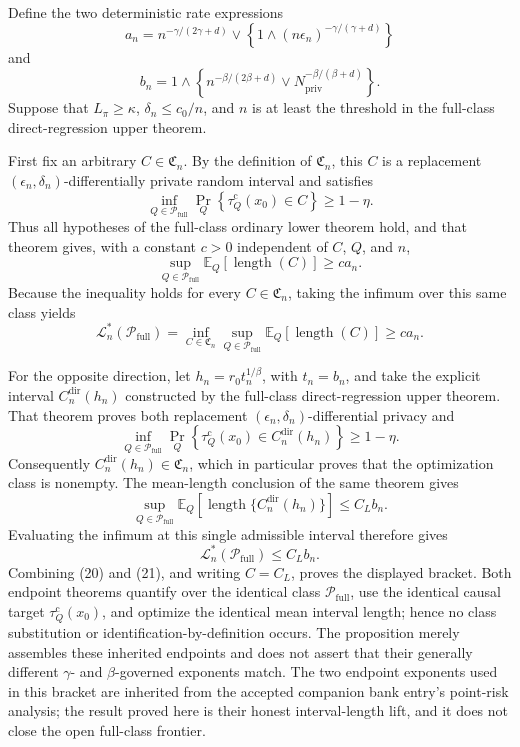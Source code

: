 Define the two deterministic rate expressions
\[
 a_n=
 n^{-\gamma/(2\gamma+d)}
 \vee\left\{1\wedge(n\epsilon_n)^{-\gamma/(\gamma+d)}\right\}
\]
and
\[
 b_n=
 1\wedge\left\{
 n^{-\beta/(2\beta+d)}
 \vee N_{\mathrm{priv}}^{-\beta/(\beta+d)}
 \right\}.
\]
Suppose that \(L_\pi\ge\kappa\), \(\delta_n\le c_0/n\), and \(n\) is at least the threshold in the full-class direct-regression upper theorem.

First fix an arbitrary \(C\in\mathfrak C_n\).  By the definition of \(\mathfrak C_n\), this \(C\) is a replacement \((\epsilon_n,\delta_n)\)-differentially private random interval and satisfies
\[
 \inf_{Q\in\mathcal P_{\mathrm{full}}}
 \Pr_Q\!\left\{\tau_Q^{\mathrm c}(x_0)\in C\right\}
 \ge 1-\eta.
\]
Thus all hypotheses of the full-class ordinary lower theorem hold, and that theorem gives, with a constant \(c>0\) independent of \(C\), \(Q\), and \(n\),
\[
 \sup_{Q\in\mathcal P_{\mathrm{full}}}
 \mathbb E_Q[\operatorname{length}(C)]
 \ge c a_n.
\]
Because the inequality holds for every \(C\in\mathfrak C_n\), taking the infimum over this same class yields
\[
 \mathcal L_n^*(\mathcal P_{\mathrm{full}})
 =\inf_{C\in\mathfrak C_n}
   \sup_{Q\in\mathcal P_{\mathrm{full}}}
   \mathbb E_Q[\operatorname{length}(C)]
 \ge c a_n.
\tag{20}
\]

For the opposite direction, let \(h_n=r_0t_n^{1/\beta}\), with \(t_n=b_n\), and take the explicit interval \(C_n^{\mathrm{dir}}(h_n)\) constructed by the full-class direct-regression upper theorem.  That theorem proves both replacement \((\epsilon_n,\delta_n)\)-differential privacy and
\[
 \inf_{Q\in\mathcal P_{\mathrm{full}}}
 \Pr_Q\!\left\{\tau_Q^{\mathrm c}(x_0)
       \in C_n^{\mathrm{dir}}(h_n)\right\}
 \ge 1-\eta.
\]
Consequently \(C_n^{\mathrm{dir}}(h_n)\in\mathfrak C_n\), which in particular proves that the optimization class is nonempty.  The mean-length conclusion of the same theorem gives
\[
 \sup_{Q\in\mathcal P_{\mathrm{full}}}
 \mathbb E_Q\!\left[
   \operatorname{length}\{C_n^{\mathrm{dir}}(h_n)\}
 \right]
 \le C_L b_n.
\]
Evaluating the infimum at this single admissible interval therefore gives
\[
 \mathcal L_n^*(\mathcal P_{\mathrm{full}})
 \le C_L b_n.
\tag{21}
\]
Combining (20) and (21), and writing \(C=C_L\), proves the displayed bracket.  Both endpoint theorems quantify over the identical class \(\mathcal P_{\mathrm{full}}\), use the identical causal target \(\tau_Q^{\mathrm c}(x_0)\), and optimize the identical mean interval length; hence no class substitution or identification-by-definition occurs.  The proposition merely assembles these inherited endpoints and does not assert that their generally different \(\gamma\)- and \(\beta\)-governed exponents match.  The two endpoint exponents used in this bracket are inherited from the accepted companion bank entry's point-risk analysis; the result proved here is their honest interval-length lift, and it does not close the open full-class frontier.
